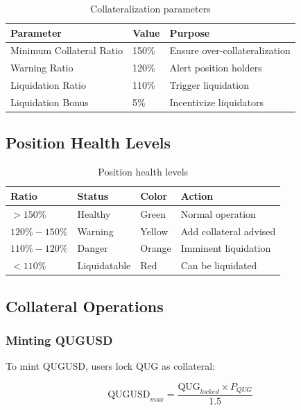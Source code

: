 \documentclass[11pt,a4paper]{article}
\begin{document}
\begin{table}[H]
\centering
\begin{tabular}{llp{6cm}}
\toprule
\textbf{Parameter} & \textbf{Value} & \textbf{Purpose} \\
\midrule
Minimum Collateral Ratio & 150\% & Ensure over-collateralization \\
Warning Ratio & 120\% & Alert position holders \\
Liquidation Ratio & 110\% & Trigger liquidation \\
Liquidation Bonus & 5\% & Incentivize liquidators \\
\bottomrule
\end{tabular}
\caption{Collateralization parameters}
\end{table}

\subsection{Position Health Levels}

\begin{table}[H]
\centering
\begin{tabular}{llll}
\toprule
\textbf{Ratio} & \textbf{Status} & \textbf{Color} & \textbf{Action} \\
\midrule
$> 150\%$ & Healthy & \textcolor{qgreen}{Green} & Normal operation \\
$120\% - 150\%$ & Warning & \textcolor{qorange}{Yellow} & Add collateral advised \\
$110\% - 120\%$ & Danger & \textcolor{qorange}{Orange} & Imminent liquidation \\
$< 110\%$ & Liquidatable & \textcolor{qred}{Red} & Can be liquidated \\
\bottomrule
\end{tabular}
\caption{Position health levels}
\end{table}

\subsection{Collateral Operations}

\subsubsection{Minting QUGUSD}

To mint QUGUSD, users lock QUG as collateral:

\begin{equation}
\text{QUGUSD}_{max} = \frac{\text{QUG}_{locked} \times P_{QUG}}{1.5}
\end{equation}
\end{document}
